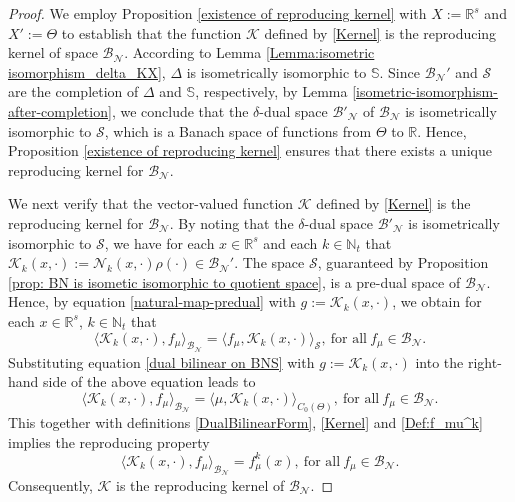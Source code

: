 \documentclass[11pt]{article}
\begin{document}
\begin{proof}
We employ Proposition \ref{existence of reproducing kernel} with $X:=\mathbb{R}^s$ and $X':=\Theta$ to establish that the function $\mathcal{K}$ defined by \eqref{Kernel} is the reproducing kernel of space $\mathcal{B}_{\mathcal{N}}$. According to Lemma \ref{Lemma:isometric isomorphism_delta_KX}, $\Delta$ is isometrically isomorphic to $\mathbb{S}$. Since $\mathcal{B}_{\mathcal{N}}'$ and $\mathcal{S}$ are the completion of $\Delta$ and $\mathbb{S}$, respectively,  by Lemma \ref{isometric-isomorphism-after-completion}, we conclude that 
the $\delta$-dual space $\mathcal{B}'_{\mathcal{N}}$ of $\mathcal{B}_{\mathcal{N}}$ is isometrically isomorphic to $\mathcal{S}$, which is a Banach space of functions from $\Theta$ to $\mathbb{R}$. 
Hence, Proposition \ref{existence of reproducing kernel} ensures that there exists a unique reproducing kernel for $\mathcal{B}_{\mathcal{N}}$. 

We next verify that the vector-valued function $\mathcal{K}$ defined by \eqref{Kernel} is the reproducing kernel for $\mathcal{B}_{\mathcal{N}}$. By noting that the $\delta$-dual space $\mathcal{B}'_{\mathcal{N}}$ is isometrically isomorphic to $\mathcal{S}$, we have for each $x\in\mathbb{R}^s$ and each $k\in\mathbb{N}_t$ that $\mathcal{K}_k(x,\cdot):=\mathcal{N}_k(x,\cdot)\rho(\cdot)\in \mathcal{B}_{\mathcal{N}}'$. The space $\mathcal{S}$, guaranteed by Proposition \ref{prop: BN is isometic isomorphic to quotient space}, is a pre-dual space of $\mathcal{B}_{\mathcal{N}}$. Hence, by equation \eqref{natural-map-predual} with $g:=\mathcal{K}_k(x,\cdot)$, we obtain for each $x\in\mathbb{R}^s$,  $k\in\mathbb{N}_t$ that 
$$
\langle\mathcal{K}_k(x,\cdot), f_{\mu}\rangle_{\mathcal{B}_{\mathcal{N}}}=\langle f_{\mu},\mathcal{K}_k(x,\cdot)\rangle_{\mathcal{S}},\ \mbox{for all}\  f_{\mu}\in\mathcal{B}_{\mathcal{N}}.
$$
Substituting equation \eqref{dual bilinear on BNS} with $g:=\mathcal{K}_k(x,\cdot)$ into the right-hand side of the above equation leads to 
$$
\langle\mathcal{K}_k(x,\cdot), f_{\mu}\rangle_{\mathcal{B}_{\mathcal{N}}}=\langle\mu, \mathcal{K}_k(x,\cdot)\rangle_{C_0(\Theta)},\ \mbox{for all}\  f_{\mu}\in\mathcal{B}_{\mathcal{N}}.
$$
This together with definitions \eqref{DualBilinearForm}, \eqref{Kernel}  and \eqref{Def:f_mu^k} implies the reproducing property 
\begin{equation}\label{proof reproducing property}
\langle\mathcal{K}_k(x,\cdot), f_{\mu}\rangle_{\mathcal{B}_{\mathcal{N}}}=f_{\mu}^k(x),\ \mbox{for all}\  f_{\mu}\in\mathcal{B}_{\mathcal{N}}.
\end{equation}
Consequently, $\mathcal{K}$ is the reproducing kernel of $\mathcal{B}_{\mathcal{N}}$. 
\end{proof}
\end{document}
